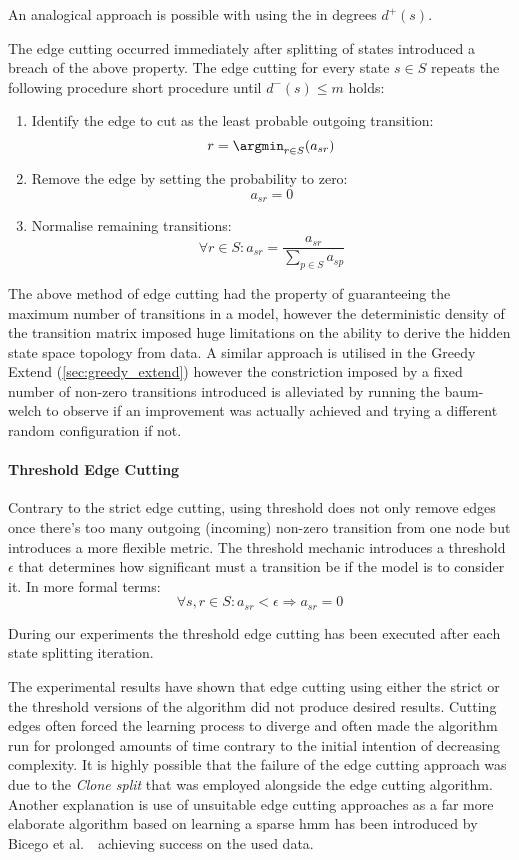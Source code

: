 An analogical approach is possible with using the in degrees $d^+(s)$.

The edge cutting occurred immediately after splitting of states introduced a breach of the above property. The edge cutting for every state $s\in S$ repeats the following procedure short procedure until $d^-(s) \le m$ holds:
\begin{enumerate}
	\item Identify the edge to cut as the least probable outgoing transition:
	$$r = \argmin_{r\in S}(a_{sr})$$
	\item Remove the edge by setting the probability to zero: $$a_{sr} = 0$$
	\item Normalise remaining transitions:
	$$\forall r \in S: a_{sr} = \frac{a_{sr}}{\sum_{p\in S}a_{sp}}$$
\end{enumerate}

The above method of edge cutting had the property of guaranteeing the maximum number of transitions in a model, however the deterministic density of the transition matrix imposed huge limitations on the ability to derive the hidden state space topology from data. A similar approach is utilised in the Greedy Extend (\ref{sec:greedy_extend}) however the constriction imposed by a fixed number of non-zero transitions introduced is alleviated by running the \gls{baum-welch} to observe if an improvement was actually achieved and trying a different random configuration if not.

\paragraph {Threshold Edge Cutting}
Contrary to the strict edge cutting, using threshold does not only remove edges once there's too many outgoing (incoming) non-zero transition from one node but introduces a more flexible metric. The threshold mechanic introduces a threshold $\epsilon$ that determines how significant must a transition be if the model is to consider it. In more formal terms:
$$\forall s,r\in S: a_{sr} < \epsilon \Rightarrow a_{sr} = 0$$

During our experiments the threshold edge cutting has been executed after each state splitting iteration. 

The experimental results have shown that edge cutting using either the strict or the threshold versions of the algorithm did not produce desired results. Cutting edges often forced the learning process to diverge and often made the algorithm run for prolonged amounts of time contrary to the initial intention of decreasing complexity. It is highly possible that the failure of the edge cutting approach was due to the \emph{Clone split} that was employed alongside the edge cutting algorithm. Another explanation is use of unsuitable edge cutting approaches as a far more elaborate algorithm based on learning a sparse \gls{hmm} has been introduced by Bicego et al.~\cite{bicego2007}~achieving success on the used data.

